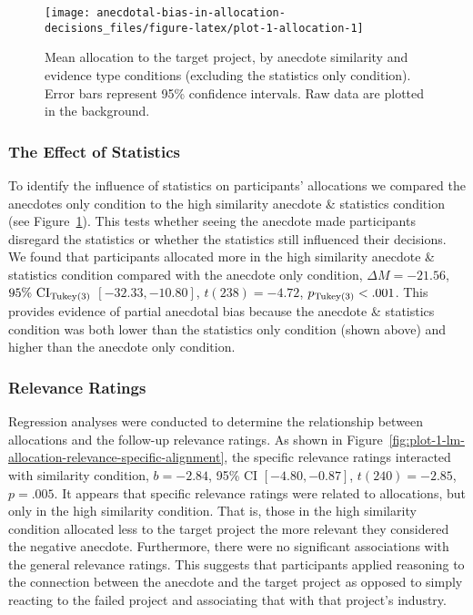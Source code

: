 \documentclass[
  man, donotrepeattitle,floatsintext]{apa7}
\theoremstyle{definition}
\theoremstyle{definition}
\theoremstyle{definition}
\theoremstyle{definition}
\theoremstyle{remark}
\begin{document}
\begin{figure}
\texttt{[image: anecdotal-bias-in-allocation-decisions\_files/figure-latex/plot-1-allocation-1]} \caption{Mean allocation to the target project, by anecdote similarity and evidence type conditions (excluding the statistics only condition). Error bars represent 95\% confidence intervals. Raw data are plotted in the background.}\label{fig:plot-1-allocation}
\end{figure}

\hypertarget{the-effect-of-statistics}{%
\subsubsection{The Effect of Statistics}\label{the-effect-of-statistics}}

To identify the influence of statistics on participants' allocations we compared
the anecdotes only condition to the high similarity anecdote \& statistics
condition (see Figure~\ref{fig:plot-1-allocation}). This tests
whether seeing the anecdote made participants disregard the statistics or
whether the statistics still influenced their decisions. We found that
participants allocated more in the high similarity anecdote \& statistics
condition compared with the anecdote only condition,
\(\Delta M = -21.56\), \(95\%\ \mathrm{CI}_\mathrm{\scriptsize Tukey(3)}\) \([-32.33, -10.80]\), \(t(238) = -4.72\), \(p_\mathrm{\scriptsize Tukey(3)} < .001\). This provides evidence of partial
anecdotal bias because the anecdote \& statistics condition was both lower than
the statistics only condition (shown above) and higher than the anecdote only
condition.

\hypertarget{relevance-ratings}{%
\subsubsection{Relevance Ratings}\label{relevance-ratings}}

Regression analyses were conducted to determine the relationship between
allocations and the follow-up relevance ratings. As shown in
Figure~\ref{fig:plot-1-lm-allocation-relevance-specific-alignment},
the specific relevance ratings interacted with similarity condition,
\(b = -2.84\), 95\% CI \([-4.80, -0.87]\), \(t(240) = -2.85\), \(p = .005\). It appears that
specific relevance ratings were related to allocations, but only in the high
similarity condition. That is, those in the high similarity condition allocated
less to the target project the more relevant they considered the negative
anecdote. Furthermore, there were no significant associations with the general
relevance ratings. This suggests that participants applied reasoning to the
connection between the anecdote and the target project as opposed to simply
reacting to the failed project and associating that with that project's
industry.
\end{document}
